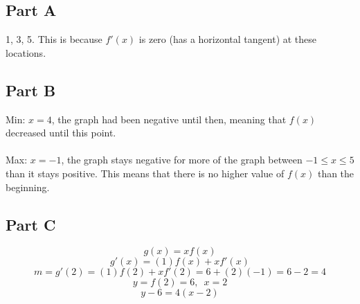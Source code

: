 
\subsection{Part A}
1, 3, 5. This is because $f'(x)$ is zero (has a horizontal tangent) at these locations.

\subsection{Part B}
Min: $x = 4$, the graph had been negative until then, meaning that $f(x)$ decreased until this point. \\ \\
Max: $x = -1$, the graph stays negative for more of the graph between $-1 \leq x \leq 5$ than it stays positive. This means that there is no higher value of $f(x)$ than the beginning.

\subsection{Part C}
\[ g(x) = xf(x) \]
\[ g'(x) = (1)f(x) + xf'(x) \]
\[ m = g'(2) = (1)f(2) + xf'(2) = 6 + (2)(-1) = 6 - 2 = 4 \]
\[ y = f(2) = 6, \enspace x = 2 \]
\[ y - 6 = 4 (x - 2) \]
